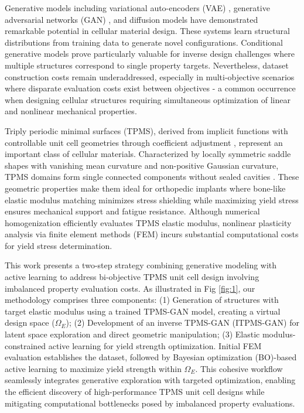 \documentclass[preprint,review,12pt,authoryear]{elsarticle}
\begin{document}
Generative models including variational auto-encoders (VAE) \citep{Wang2020a,Zheng2023}, generative adversarial networks (GAN) \citep{Nie2020,Shen2022,Kim2020b}, and diffusion models \citep{Bastek2023,Maze2022,Vlassis2023} have demonstrated remarkable potential in cellular material design. These systems learn structural distributions from training data to generate novel configurations. Conditional generative models prove particularly valuable for inverse design challenges where multiple structures correspond to single property targets. Nevertheless, dataset construction costs remain underaddressed, especially in multi-objective scenarios where disparate evaluation costs exist between objectives - a common occurrence when designing cellular structures requiring simultaneous optimization of linear and nonlinear mechanical properties.

Triply periodic minimal surfaces (TPMS), derived from implicit functions with controllable unit cell geometries through coefficient adjustment \citep{Ma2020a}, represent an important class of cellular materials. Characterized by locally symmetric saddle shapes with vanishing mean curvature and non-positive Gaussian curvature, TPMS domains form single connected components without sealed cavities \citep{Kapfer2011}. These geometric properties make them ideal for orthopedic implants where bone-like elastic modulus matching minimizes stress shielding while maximizing yield stress ensures mechanical support and fatigue resistance. Although numerical homogenization efficiently evaluates TPMS elastic modulus, nonlinear plasticity analysis via finite element methods (FEM) incurs substantial computational costs for yield stress determination.

This work presents a two-step strategy combining generative modeling with active learning to address bi-objective TPMS unit cell design involving imbalanced property evaluation costs. As illustrated in Fig \ref{fig:1}, our methodology comprises three components: (1) Generation of structures with target elastic modulus using a trained TPMS-GAN model, creating a virtual design space ($\Omega_E$); (2) Development of an inverse TPMS-GAN (ITPMS-GAN) for latent space exploration and direct geometric manipulation; (3) Elastic modulus-constrained active learning for yield strength optimization. Initial FEM evaluation establishes the dataset, followed by Bayesian optimization (BO)-based active learning \citep{Ma2024b,Cao2024a,Tian2024a} to maximize yield strength within $\Omega_E$. This cohesive workflow seamlessly integrates generative exploration with targeted optimization, enabling the efficient discovery of high-performance TPMS unit cell designs while mitigating computational bottlenecks posed by imbalanced property evaluations.
\end{document}
